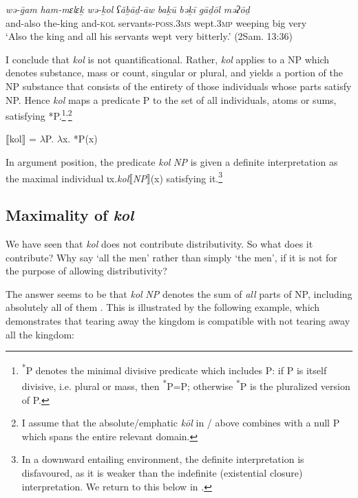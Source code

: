 \documentclass[output=paper]{langsci/langscibook}
\begin{document}
\ea%
    \label{ex:doron:21}
    \gll \textit{wə-ḡam}   \textit{ham-mɛlɛḵ}  \textit{wə-ḵol}     \textit{ʕăḇāḏ-āw}                  \textit{baḵū}          \textit{bəḵī}         \textit{gāḏōl} \textit{məʔōḏ}\\
         and-also  the-king      and-\textsc{kol} servants-\textsc{poss.3ms}  wept.\textsc{3mp}   weeping  big      very\\
    \glt `Also the king and all his servants wept very bitterly.' (2Sam. 13:36)
\z



I conclude that \textit{kol} is not quantificational. Rather, \textit{kol} applies to a NP which denotes substance, mass or count, singular or plural, and yields a portion of the NP substance that consists of the entirety of those individuals whose parts satisfy NP. Hence \textit{kol} maps a predicate P to the set of all individuals, atoms or sums, satisfying *P.\footnote{\textrm{\textsuperscript{*}}\textrm{P denotes the minimal divisive predicate \citep{Krifka1989} which includes P: if P is itself divisive, i.e. plural or mass, then} \textrm{\textsuperscript{*}}\textrm{P=P; otherwise} \textrm{\textsuperscript{*}}\textrm{P is the pluralized version of P.}}\textsuperscript{,}\footnote{\textrm{I assume that the absolute/emphatic} \textrm{\textit{kōl} }\textrm{in / above combines with a null P which spans the entire relevant domain.}}

\ea%
    \label{ex:doron:22}\relax
    $⟦$kol$⟧$ =  ${\lambda}$P. ${\lambda}$x. *P(x)
    \z

In argument position, the predicate \textit{kol} \textit{NP} is given a definite interpretation as the maximal individual ιx.\textit{kol}$⟦$\textit{NP}$⟧$(x) satisfying it.\footnote{\textrm{In a downward entailing environment, the definite interpretation is disfavoured, as it is weaker than the indefinite (existential closure) interpretation. We return to this below in .}}

\subsection{Maximality of \textit{kol}}\label{sec:doron:3.2}%

We have seen that \textit{kol} does not contribute distributivity. So what does it contribute? Why say ‘all the men’ rather than simply ‘the men’, if it is not for the purpose of allowing distributivity?

The answer seems to be that \textit{kol} \textit{NP} denotes the sum of \textit{all} parts of NP, including absolutely all of them \citep{Brisson1997,Brisson2003}. This is illustrated by the following example, which demonstrates that tearing away the kingdom is compatible with not tearing away all the kingdom:
\end{document}
